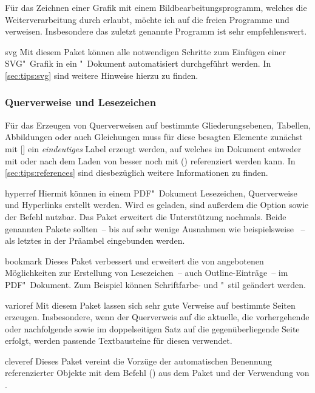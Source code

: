 Für das Zeichnen einer Grafik mit einem Bildbearbeitungsprogramm, welches die 
Weiterverarbeitung durch  erlaubt, möchte ich auf die freien 
Programme  und  verweisen. 
Insbesondere das zuletzt genannte Programm ist sehr empfehlenswert. 
%
\begin{packages}
\item[svg]
  Mit diesem Paket können alle notwendigen Schritte zum Einfügen einer 
  SVG"~Grafik in ein "~Dokument automatisiert durchgeführt 
  werden. In \autoref{sec:tips:svg} sind weitere Hinweise hierzu zu finden.
\end{packages}
%



\subsubsection{%
  Querverweise und Lesezeichen%
}
Für das Erzeugen von Querverweisen auf bestimmte Gliederungsebenen, Tabellen, 
Abbildungen oder auch Gleichungen muss für diese besagten Elemente zunächst mit 
[] ein \emph{eindeutiges} Label erzeugt werden, auf 
welches im Dokument entweder mit  oder nach dem Laden von 
 besser noch mit () 
referenziert werden kann. In \autoref{sec:tips:references} sind diesbezüglich 
weitere Informationen zu finden.
%
\begin{packages}
\item[hyperref]
  Hiermit können in einem PDF"~Dokument Lesezeichen, Querverweise und 
  Hyperlinks erstellt werden. Wird es geladen, sind außerdem die Option 
   sowie der Befehl  nutzbar. Das 
  Paket  erweitert die Unterstützung nochmals. Beide 
  genannten Pakete sollten~-- bis auf sehr wenige Ausnahmen wie beispielsweise 
  ~-- als letztes in der Präambel eingebunden werden.
\item[bookmark]
  Dieses Paket verbessert und erweitert die von  angebotenen 
  Möglichkeiten zur Erstellung von Lesezeichen~-- auch Outline-Einträge~-- im 
  PDF"~Dokument. Zum Beispiel können Schriftfarbe- und "~stil geändert werden.
\item[varioref]
  Mit diesem Paket lassen sich sehr gute Verweise auf bestimmte Seiten 
  erzeugen. Insbesondere, wenn der Querverweis auf die aktuelle, die 
  vorhergehende oder nachfolgende sowie im doppelseitigen Satz auf die 
  gegenüberliegende Seite erfolgt, werden passende Textbausteine für diesen 
  verwendet.
\item[cleveref]
  Dieses Paket vereint die Vorzüge der automatischen Benennung referenzierter 
  Objekte mit dem Befehl () aus dem Paket 
   und der Verwendung von .
\end{packages}
%
%



